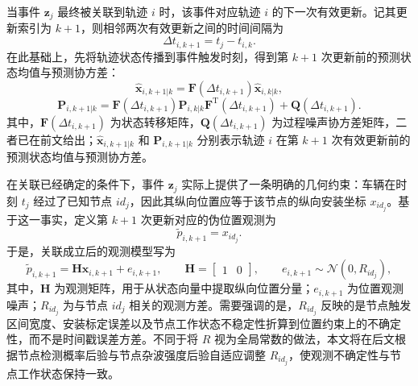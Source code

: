 \documentclass{xdupgthesis}
\begin{document}
当事件 $\mathbf z_j$ 最终被关联到轨迹 $i$ 时，该事件对应轨迹 $i$ 的下一次有效更新。记其更新索引为 $k+1$，则相邻两次有效更新之间的时间间隔为
\begin{equation}
	\Delta t_{i,k+1}=t_j-t_{i,k}.
	\label{eq:ch3_dt_update}
\end{equation}
在此基础上，先将轨迹状态传播到事件触发时刻，得到第 $k+1$ 次更新前的预测状态均值与预测协方差：
\begin{equation}
	\hat{\mathbf x}_{i,k+1|k}
	=
	\mathbf F\!\left(\Delta t_{i,k+1}\right)\hat{\mathbf x}_{i,k|k},
	\label{eq:ch3_predict_state}
\end{equation}
\begin{equation}
	\mathbf P_{i,k+1|k}
	=
	\mathbf F\!\left(\Delta t_{i,k+1}\right)
	\mathbf P_{i,k|k}
	\mathbf F^{\mathrm T}\!\left(\Delta t_{i,k+1}\right)
	+
	\mathbf Q\!\left(\Delta t_{i,k+1}\right).
	\label{eq:ch3_predict_cov}
\end{equation}
其中，$\mathbf F(\Delta t_{i,k+1})$ 为状态转移矩阵，$\mathbf Q(\Delta t_{i,k+1})$ 为过程噪声协方差矩阵，二者已在前文给出；$\hat{\mathbf x}_{i,k+1|k}$ 和 $\mathbf P_{i,k+1|k}$ 分别表示轨迹 $i$ 在第 $k+1$ 次有效更新前的预测状态均值与预测协方差。

在关联已经确定的条件下，事件 $\mathbf z_j$ 实际上提供了一条明确的几何约束：车辆在时刻 $t_j$ 经过了已知节点 $id_j$，因此其纵向位置应等于该节点的纵向安装坐标 $x_{id_j}$。基于这一事实，定义第 $k+1$ 次更新对应的伪位置观测为
\begin{equation}
	\tilde p_{i,k+1}=x_{id_j}.
	\label{eq:ch3_pseudo_meas}
\end{equation}
于是，关联成立后的观测模型写为
\begin{equation}
	\tilde p_{i,k+1}
	=
	\mathbf H\mathbf x_{i,k+1}
	+
	e_{i,k+1},
	\qquad
	\mathbf H=
	\begin{bmatrix}
		1 & 0
	\end{bmatrix},
	\qquad
	e_{i,k+1}\sim\mathcal N(0,R_{id_j}),
	\label{eq:ch3_measurement_k}
\end{equation}
其中，$\mathbf H$ 为观测矩阵，用于从状态向量中提取纵向位置分量；$e_{i,k+1}$ 为位置观测噪声；$R_{id_j}$ 为与节点 $id_j$ 相关的观测方差。需要强调的是，$R_{id_j}$ 反映的是节点触发区间宽度、安装标定误差以及节点工作状态不稳定性折算到位置约束上的不确定性，而不是时间戳误差方差。不同于将 $R$ 视为全局常数的做法，本文将在后文根据节点检测概率后验与节点杂波强度后验自适应调整 $R_{id_j}$，使观测不确定性与节点工作状态保持一致。
\end{document}
